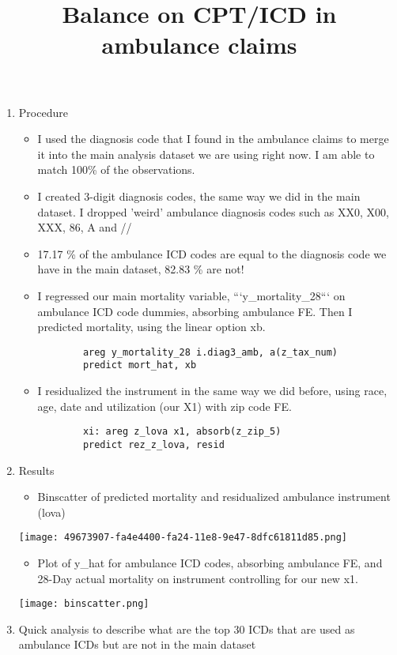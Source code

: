 \documentclass{article}
\begin{document}
\title{Balance on CPT/ICD in ambulance claims}
\begin{enumerate}
	\item Procedure
	\begin{itemize}
		\item I used the diagnosis code that I found in the ambulance claims to merge it into the main analysis dataset we are using right now. I am able to match 100\% of the observations.
		\item I created 3-digit diagnosis codes, the same way we did in the main dataset. I dropped 'weird' ambulance diagnosis codes such as XX0, X00, XXX, 86, A and //
		\item 17.17 \% of the ambulance ICD codes are equal to the diagnosis code we have in the main dataset, 82.83 \% are not!
		\item I regressed our main mortality variable, ```y\_mortality\_28``` on ambulance ICD code dummies, absorbing ambulance FE. Then I predicted mortality, using the linear option xb.
		\begin{lstlisting}
		areg y_mortality_28 i.diag3_amb, a(z_tax_num)
		predict mort_hat, xb
		\end{lstlisting}
		\item I residualized the instrument in the same way we did before, using race, age, date and utilization (our X1) with zip code FE.

		\begin{lstlisting}
		xi: areg z_lova x1, absorb(z_zip_5)
		predict rez_z_lova, resid
		\end{lstlisting}
	\end{itemize}
	\newpage
	\item Results

	\begin{itemize}
		\item Binscatter of predicted mortality and residualized ambulance instrument (lova)
	\end{itemize}
		\texttt{[image: 49673907-fa4e4400-fa24-11e8-9e47-8dfc61811d85.png]}
	
	\begin{itemize}
		\item Plot of y\_hat for ambulance ICD codes, absorbing ambulance FE, and 28-Day actual mortality on instrument controlling for our new x1.
	\end{itemize}
	\texttt{[image: binscatter.png]}
	\newpage
	\item Quick analysis to describe what are the top 30 ICDs that are used as ambulance ICDs but are not in the main dataset
	\begin{markdown}


\end{markdown}
\end{enumerate}
\end{document}
